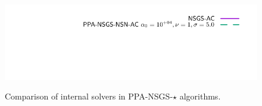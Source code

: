 \begin{figure}
\\
{\includegraphics[height=\legendheight]{figure/PROX/NSGS/InternalSolvers/1.0e-08/50/time/profile-Chain_legend.pdf}}
 \caption{Comparison of internal solvers in {\sf PPA-NSGS-$\star$} algorithms.}
  \label{fig:PROX/NSGS/InternalSolvers}
\end{figure}

